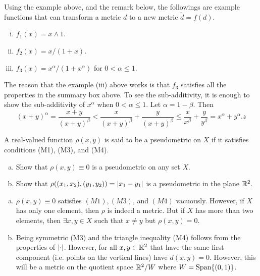 \begin{summary}
	Using the example above, and the remark below, the followings are example functions that can transform a metric $ d $ to a new metric $ \tilde{d} = f(d) $.
	\begin{enumerate}[(i)]
		\item $ f_1(x) = x\wedge 1 $.
		\item $ f_2(x) = x/(1+x) $.
		\item $ f_3(x) = x^\alpha/(1+x^\alpha) $ for $ 0<\alpha\leq1 $.
	\end{enumerate}
	\begin{remark}
		The reason that the example (iii) above works is that $ f_3 $ satisfies all the properties in the summary box above. To see the sub-additivity, it is enough to show the sub-additivity of $ x^\alpha $ when $ 0 < \alpha \leq 1 $. Let $ \alpha = 1-\beta $. Then 
		\[ (x+y)^\alpha = \frac{x+y}{(x+y)^\beta} < \frac{x}{(x+y)^\beta} + \frac{y}{(x+y)^\beta} \leq \frac{x}{x^\beta} + \frac{y}{y^\beta} = x^\alpha + y^\alpha.z  \]
	\end{remark}
\end{summary}


\begin{problem}
	A real-valued function $ \rho(x,y) $ is said to be a pseudometric on $ X $ if it satisfies conditions (M1), (M3), and (M4).
	\begin{enumerate}[(a)]
		\item Show that $ \rho(x,y)\equiv 0 $ is a pseudometric on any set $ X $.
		\item Show that $ \rho((x_1,x_2),(y_1,y_2)) = \left|x_1-y_1\right| $ is a pseudometric in the plane $ \mathbb{R}^2 $.
	\end{enumerate}
\end{problem}
\begin{solution}
	\begin{enumerate}[(a)]
		\item $ \rho(x,y)\equiv 0 $ satisfies $ (M1), (M3) $, and $ (M4) $ vacuously. However, if $ X $ has only one element, then $ \rho $ is indeed a metric. But if $ X $ has more than two elements, then $ \exists x,y \in X $ such that $ x\neq y $ but $ \rho(x,y) = 0 $.
		
		\item Being symmetric (M3) and the triangle inequality (M4) follows from the properties of $ \left|\cdot\right| $. However, for all $ x,y \in \mathbb{R}^2 $ that have the same first component (i.e. points on the vertical lines) have $ d(x,y) = 0 $. However, this will be a metric on the quotient space $ \mathbb{R}^2/W $ where $ W = \operatorname{Span}\{(0,1)\} $.
  	\end{enumerate}
\end{solution}

